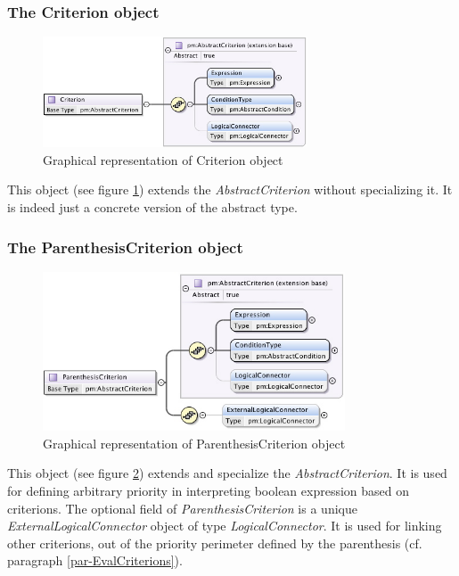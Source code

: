 \documentclass[a4paper,11pt] {article}
\begin{document}
\subsubsection{The Criterion object}
\begin{figure}[htbp]
\begin{center}
\includegraphics[width=0.7\textwidth]{pictures/Criterion.jpg} 
\caption{Graphical representation of Criterion object}
\label{Pic-Criterion}
\end{center}
\end{figure}
This object (see figure \ref{Pic-Criterion}) extends the  {\it AbstractCriterion} without
specializing it. It is indeed just a concrete version of the abstract type.

\subsubsection{The ParenthesisCriterion object}
\begin{figure}[htbp]
\begin{center}
\includegraphics[width=0.8\textwidth]{pictures/ParenthesisCriterion.jpg} 
\caption{Graphical representation of ParenthesisCriterion object}
\label{Pic-ParenthesisCriterion}
\end{center}
\end{figure}
This object (see figure \ref{Pic-ParenthesisCriterion}) extends and specialize the  {\it
AbstractCriterion}. It is used for defining arbitrary priority in interpreting boolean expression
based on criterions.
The optional field of {\it ParenthesisCriterion} is a unique {\it ExternalLogicalConnector} object
of type {\it LogicalConnector}. It is used for linking other criterions, out of the priority
perimeter defined by the parenthesis (cf.  paragraph \ref{par-EvalCriterions}).
\end{document}
